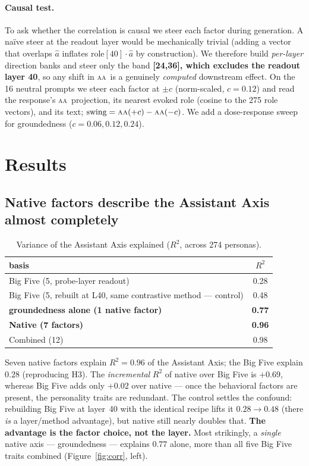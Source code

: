 \documentclass[11pt]{article}
\renewcommand{\aa}{\textsc{aa}}
\newcommand{\R}{R^2}
\begin{document}
\paragraph{Causal test.} To ask whether the correlation is causal we steer each
factor during generation. A na\"ive steer at the readout layer would be mechanically
trivial (adding a vector that overlaps $\hat a$ inflates $\text{role}[40]\cdot\hat a$
by construction). We therefore build \emph{per-layer} direction banks and steer only
the band \textbf{[24,36], which excludes the readout layer 40}, so any shift in \aa\
is a genuinely \emph{computed} downstream effect. On the 16 neutral prompts we steer
each factor at $\pm c$ (norm-scaled, $c=0.12$) and read the response's \aa\
projection, its nearest evoked role (cosine to the 275 role vectors), and its text;
$\text{swing}=\aa(+c)-\aa(-c)$. We add a dose-response sweep for groundedness
($c=0.06,0.12,0.24$).

\section{Results}

\subsection{Native factors describe the Assistant Axis almost completely}
\begin{table}[h]\centering
\caption{Variance of the Assistant Axis explained ($\R$, across 274 personas).}
\label{tab:r2}
\begin{tabular}{@{}lc@{}}
\toprule
basis & $\R$ \\ \midrule
Big Five (5, probe-layer readout) & 0.28 \\
Big Five (5, rebuilt at L40, same contrastive method --- control) & 0.48 \\
\textbf{groundedness alone (1 native factor)} & \textbf{0.77} \\
\textbf{Native (7 factors)} & \textbf{0.96} \\
Combined (12) & 0.98 \\ \bottomrule
\end{tabular}
\end{table}

Seven native factors explain $\R=0.96$ of the Assistant Axis; the Big Five explain
$0.28$ (reproducing H3). The \emph{incremental} $\R$ of native over Big Five is
$+0.69$, whereas Big Five adds only $+0.02$ over native --- once the behavioral
factors are present, the personality traits are redundant. The control settles the
confound: rebuilding Big Five at layer~40 with the identical recipe lifts it
$0.28\!\to\!0.48$ (there \emph{is} a layer/method advantage), but native still nearly
doubles that. \textbf{The advantage is the factor choice, not the layer.} Most
strikingly, a \emph{single} native axis --- groundedness --- explains $0.77$ alone,
more than all five Big Five traits combined (Figure~\ref{fig:corr}, left).
\end{document}
